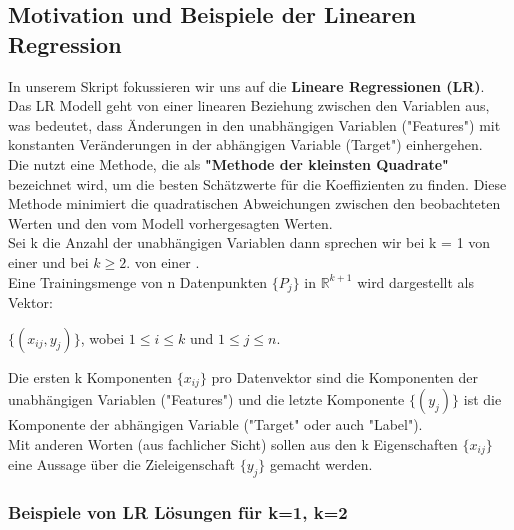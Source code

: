 \documentclass[12pt]{article}
\begin{document}
\subsection{Motivation und Beispiele der Linearen Regression}

In unserem Skript fokussieren wir uns auf die \textbf{Lineare Regressionen (LR)}.
Das LR Modell geht von einer linearen Beziehung zwischen den Variablen aus, was bedeutet, dass Änderungen in den unabhängigen Variablen ("Features") mit konstanten Veränderungen in der abhängigen Variable (Target") einhergehen.\\
Die  {\color{blue}{lineare Regression}}  nutzt eine Methode, die als \textbf{"Methode der kleinsten Quadrate"} bezeichnet wird, um die besten Schätzwerte für die Koeffizienten zu finden. Diese Methode minimiert die quadratischen Abweichungen zwischen den beobachteten Werten und den vom Modell vorhergesagten Werten. \\
Sei k die Anzahl der unabhängigen Variablen dann sprechen wir bei k = 1 von einer {\color{blue}{"Einfachen (simple) Linearen Regression" (sLR)}} und bei $k\geqslant 2.$ von einer {\color{blue}{"Multidimensionalen (multiplen) Linearen Regression"(mLR)}}.\\
Eine Trainingsmenge von n Datenpunkten $\lbrace P_j \rbrace$ in $\mathbb{R}^{k+1} $ wird dargestellt als Vektor: 
\begin{center}
$ \lbrace(x_{ij},y_j) \rbrace$,  wobei $1 \leq i \leq k $ und $1 \leq j \leq n $.\\
\end{center} 
Die ersten k Komponenten $\lbrace x_{ij} \rbrace $ pro Datenvektor sind die Komponenten der unabhängigen Variablen ("Features") und die letzte Komponente $ \lbrace(y_j)\rbrace $ ist die Komponente der abhängigen Variable ("Target" oder auch "Label").\\  Mit anderen Worten (aus fachlicher Sicht) sollen aus den k Eigenschaften $\lbrace x_{ij} \rbrace$ eine Aussage über die Zieleigenschaft $\lbrace y_j \rbrace$ gemacht werden.   

\subsubsection{Beispiele von LR Lösungen für k=1, k=2}
\end{document}
